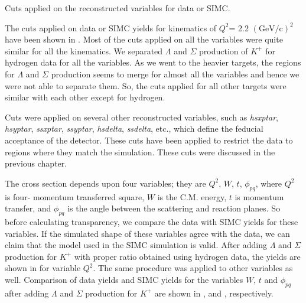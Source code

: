 \begin{table}
  \caption[Cuts applied on the reconstructed variables for data or SIMC.]{\label{tab:cuts}Cuts applied on the reconstructed variables for data or SIMC.}

\end{table}

The cuts applied on data or SIMC yields for kinematics of $Q^2$= 2.2 $(\mathrm{GeV/c})^2$ have been shown in . Most of the cuts applied on all the variables were quite similar for all the kinematics. We separated $\Lambda$ and $\Sigma$ production of $K^+$ for hydrogen data for all the variables. As we went to the heavier targets, the regions for $\Lambda$ and $\Sigma$ production seems to merge for almost all the variables and hence we were not able to separate them. So, the cuts applied for all other targets were similar with each other except for hydrogen.

%
%
\label{Other Cuts}
Cuts were applied on several other reconstructed variables, such as \textit{hsxptar}, \textit{hsyptar}, \textit{ssxptar}, \textit{ssyptar}, \textit{hsdelta}, \textit{ssdelta}, etc., which define the feducial acceptance of the detector. These cuts have been applied to restrict the data to regions where they match the simulation. These cuts were discussed in the previous chapter.


%
%
\label{Comparison of Data with SIMC Yields}
The cross section depends upon four variables; they are $Q^2$, $W$, $t$, $\phi_{pq}$, where $Q^2$ is four- momentum transferred square, $W$ is the C.M. energy, $t$ is momentum transfer, and $\phi_{pq}$ is  the angle between the scattering and reaction planes. So before calculating transparency, we compare the data with SIMC yields for these variables. If the simulated shape of these variables agree with the data, we can claim that the model used in the SIMC simulation is valid. After adding $\Lambda$ and $\Sigma$ production for $K^+$ with proper ratio obtained using hydrogen data, the yields are shown in  for variable $Q^2$. The same procedure was applied to other variables as well. Comparison of data yields and SIMC yields for the variables $W$, $t$ and $\phi_{pq}$ after adding $\Lambda$ and $\Sigma$ production for $K^+$ are shown in ,  and  , respectively.

